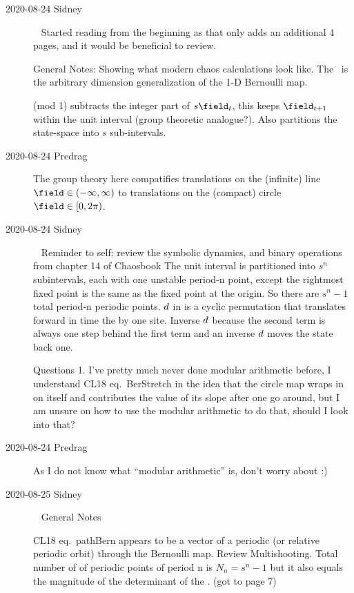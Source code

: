 \begin{description}
\item[2020-08-24 Sidney]~
Started reading from the beginning as that only adds an additional 4 pages, and it would be beneficial to review.

\vspace{3mm}

General Notes:
Showing what modern chaos calculations look like.
The \catlatt\ is the arbitrary dimension generalization of the 1-D Bernoulli map.

(mod 1) subtracts the integer part of $s\field_t$, this keeps $\field_{t+1}$
within the unit interval (group theoretic analogue?). Also partitions
the state-space into $s$ sub-intervals.

\item[2020-08-24 Predrag]
The group theory here compatifies translations on the (infinite) line
$\field\in(-\infty,\infty)$ to translations on the (compact) circle
$\field\in[0,2\pi)$.

\item[2020-08-24 Sidney]~
Reminder to self: review the symbolic dynamics, and binary operations from
chapter 14 of Chaosbook The unit interval is partitioned into $s^n$
subintervals, each with one unstable period-n point, except the rightmost
fixed point is the same as the fixed point at the origin. So there are
$s^n-1$ total period-n periodic points. $d$ in  is a
cyclic permutation that translates forward in time the {\lattstate} by one
site. Inverse $d$ because the second term is always one step behind the
first term and an inverse $d$ moves the state back one.
\vspace{3mm}

Questions
1. I've pretty much never done modular arithmetic before, I understand CL18 eq.~{BerStretch} in the idea that the circle map wraps in on itself and contributes the value of its slope after one go around, but I am unsure on how to use the modular arithmetic to do that, should I look into that?

\item[2020-08-24 Predrag]
As I do not know what ``modular arithmetic'' is, don't worry about :)

\item[2020-08-25 Sidney]~
General Notes

CL18 eq.~{pathBern} appears to be a vector of a periodic (or relative
periodic orbit) through the Bernoulli map. Review Multishooting. Total
number of of periodic points of period n is $N_n=s^n-1$ but it also
equals the magnitude of the determinant of the {\jacobianOrb}.
(got to page 7)


\end{description}
